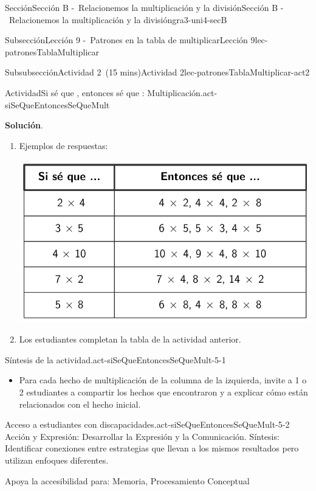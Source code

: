 \documentclass[oneside,10pt,]{article}
\newcommand{\blocktitlefont}{\relax}
\begin{document}
\begin{sectionptx}{Sección}{Sección B -~Relacionemos la multiplicación y la división}{}{Sección B -~Relacionemos la multiplicación y la división}{}{}{gra3-uni4-secB}
\begin{subsectionptx}{Subsección}{Lección 9 -~Patrones en la tabla de multiplicar}{}{Lección 9}{}{}{lec-patronesTablaMultiplicar}
\begin{subsubsectionptx}{Subsubsección}{Actividad 2~(15 mins)}{}{Actividad 2}{}{}{lec-patronesTablaMultiplicar-act2}
\begin{activity}{Actividad}{Si sé que \textellipsis{}, entonces sé que \textellipsis{}: Multiplicación.}{act-siSeQueEntoncesSeQueMult}
\begin{enumerate}
\end{enumerate}
\par\smallskip%
\noindent\textbf{\blocktitlefont Solución}.\hypertarget{act-siSeQueEntoncesSeQueMult-3}{}\quad{}%
\begin{enumerate}
\item{}Ejemplos de respuestas:%
\begin{image}{0}{1}{0}{}%
\includegraphics[width=\linewidth]{external/tikz-source/siSeQueEntoncesSeQueMult-tab-sol.pdf}
\end{image}%
\item{}Los estudiantes completan la tabla de la actividad anterior.%
\end{enumerate}
\end{activity}%
%
\par
\begin{paragraphs}{Síntesis de la actividad.}{act-siSeQueEntoncesSeQueMult-5-1}%
%
\begin{itemize}[label=\textbullet]
\item{}Para cada hecho de multiplicación de la columna de la izquierda, invite a 1 o 2 estudiantes a compartir los hechos que encontraron y a explicar cómo están relacionados con el hecho inicial.%
\end{itemize}
\end{paragraphs}%
\begin{paragraphs}{Acceso a estudiantes con discapacidades.}{act-siSeQueEntoncesSeQueMult-5-2}%
Acción y Expresión: Desarrollar la Expresión y la Comunicación. Síntesis: Identificar conexiones entre estrategias que llevan a los mismos resultados pero utilizan enfoques diferentes.%
\par
Apoya la accesibilidad para: Memoria, Procesamiento Conceptual%

\end{paragraphs}
\end{subsubsectionptx}
\end{subsectionptx}
\end{sectionptx}
\end{document}
